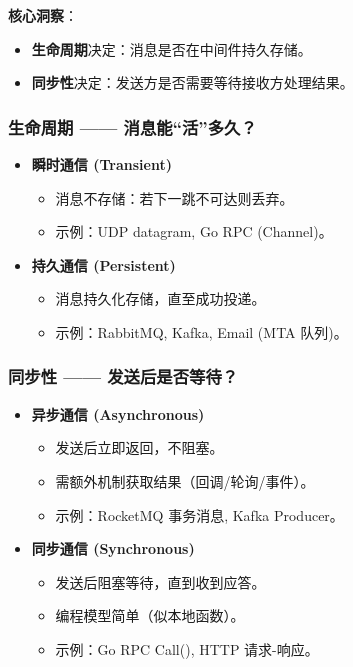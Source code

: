 \textbf{核心洞察}：
\begin{itemize}
\item \textbf{生命周期}决定：消息是否在中间件持久存储。
\item \textbf{同步性}决定：发送方是否需要等待接收方处理结果。
\end{itemize}

\subsubsection{生命周期 —— 消息能“活”多久？}

\begin{itemize}
\item \textbf{瞬时通信 (Transient)}
  \begin{itemize}
  \item 消息不存储：若下一跳不可达则丢弃。
  \item 示例：UDP datagram, Go RPC (Channel)。
  \end{itemize}
\item \textbf{持久通信 (Persistent)}
  \begin{itemize}
  \item 消息持久化存储，直至成功投递。
  \item 示例：RabbitMQ, Kafka, Email (MTA 队列)。
  \end{itemize}
\end{itemize}

\subsubsection{同步性 —— 发送后是否等待？}

\begin{itemize}
\item \textbf{异步通信 (Asynchronous)}
  \begin{itemize}
  \item 发送后立即返回，不阻塞。
  \item 需额外机制获取结果（回调/轮询/事件）。
  \item 示例：RocketMQ 事务消息, Kafka Producer。
  \end{itemize}
\item \textbf{同步通信 (Synchronous)}
  \begin{itemize}
  \item 发送后阻塞等待，直到收到应答。
  \item 编程模型简单（似本地函数）。
  \item 示例：Go RPC Call(), HTTP 请求-响应。
  \end{itemize}
\end{itemize}

